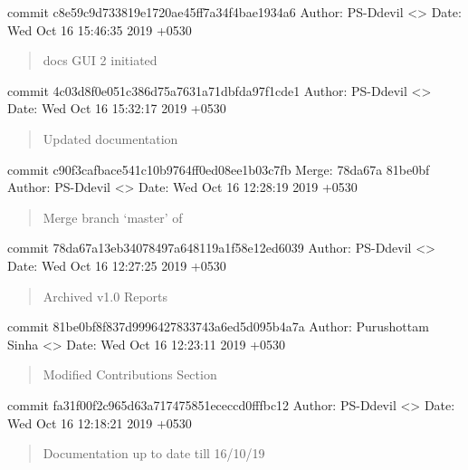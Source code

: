 \documentclass[letterpaper,10pt,english]{sphinxmanual}
\begin{document}
commit c8e59c9d733819e1720ae45ff7a34f4bae1934a6
Author: PS-Ddevil \textless{}\textgreater{}
Date:   Wed Oct 16 15:46:35 2019 +0530
\begin{quote}

docs GUI 2 initiated
\end{quote}

commit 4c03d8f0e051c386d75a7631a71dbfda97f1cde1
Author: PS-Ddevil \textless{}\textgreater{}
Date:   Wed Oct 16 15:32:17 2019 +0530
\begin{quote}

Updated documentation
\end{quote}

commit c90f3cafbace541c10b9764ff0ed08ee1b03c7fb
Merge: 78da67a 81be0bf
Author: PS-Ddevil \textless{}\textgreater{}
Date:   Wed Oct 16 12:28:19 2019 +0530
\begin{quote}

Merge branch ‘master’ of 
\end{quote}

commit 78da67a13eb34078497a648119a1f58e12ed6039
Author: PS-Ddevil \textless{}\textgreater{}
Date:   Wed Oct 16 12:27:25 2019 +0530
\begin{quote}

Archived v1.0 Reports
\end{quote}

commit 81be0bf8f837d9996427833743a6ed5d095b4a7a
Author: Purushottam Sinha \textless{}\textgreater{}
Date:   Wed Oct 16 12:23:11 2019 +0530
\begin{quote}

Modified Contributions Section
\end{quote}

commit fa31f00f2c965d63a717475851ececcd0fffbc12
Author: PS-Ddevil \textless{}\textgreater{}
Date:   Wed Oct 16 12:18:21 2019 +0530
\begin{quote}

Documentation up to date till 16/10/19
\end{quote}
\end{document}
